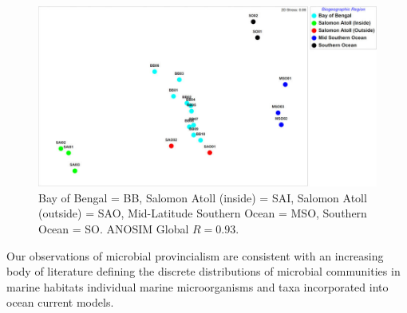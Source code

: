 \begin{figure}
    \centering
    \includegraphics[width=\textwidth]{Chagos/figures/fig2}
    \caption{Bay of Bengal = BB, Salomon Atoll (inside) = SAI, Salomon Atoll (outside) = SAO, Mid-Latitude Southern Ocean = MSO, Southern Ocean = SO. ANOSIM Global $R = 0.93$.}
    \label{Chagos_fig2}
\end{figure}

Our observations of microbial provincialism are consistent with an increasing body of literature defining the discrete distributions of microbial communities in marine habitats \cite{brown_microbial_2009, agogue_water_2011, jeffries_substrate_2011, galand_unique_2009} individual marine microorganisms \cite{gomez-pereira_distinct_2010, brown_global_2012} and taxa incorporated into ocean current models. \cite{wilkins_advection_2013, hellweger_biogeographic_2014}

